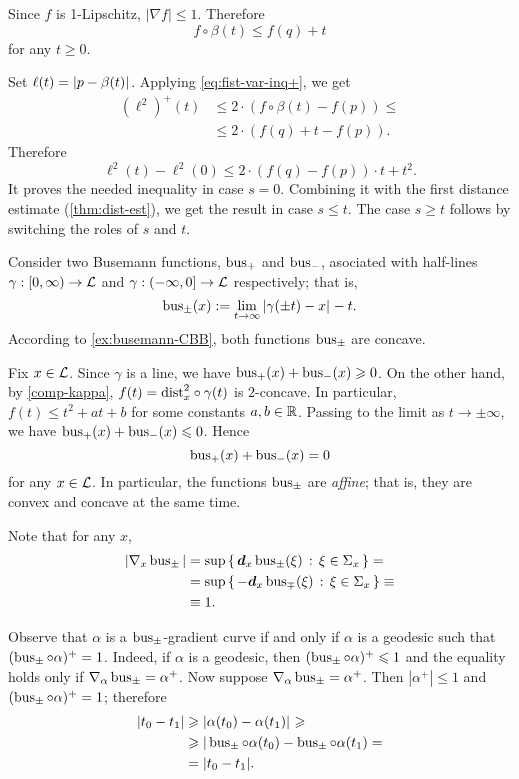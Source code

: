 Since $f$ is 1-Lipschitz, $|\nabla f|\le1$.
Therefore 
\[f\circ\beta(t)\le f(q)+t\]
for any $t\ge0$.

Set $\ell(t)=\dist{p}{\beta(t)}{}$.
Applying \ref{eq:fist-var-inq+}, we get
\begin{align*}
(\ell^2)^+(t)
&\le 2\cdot \left(f\circ\beta(t)-f(p)\right)\le 
\\
&\le2\cdot\left(f(q)+t-f(p)\right).
\end{align*}
Therefore 
\[\ell^2(t)-\ell^2(0)\le 2\cdot\left(f(q)-f(p)\right)\cdot t + t^2.\]
It proves the needed inequality in case $s=0$.
Combining it with the first distance estimate (\ref{thm:dist-est}), we get the result in case $s\le t$.
The case $s\ge t$ follows by switching the roles of $s$ and $t$.
\qeds


 Consider two Busemann functions, $\operatorname{\rm bus}\nolimits_+$ and $\operatorname{\rm bus}\nolimits_-$, asociated with half-lines $\gamma:[0,\infty)\to \mathcal{L}$ and $\gamma:(-\infty,0]\to \mathcal{L}$ respectively; that is,
\[
\bus_\pm(x)
\df
\lim_{t\to\infty}\dist{\gamma(\pm t)}{x}{}- t.
\]
According to \ref{ex:busemann-CBB}, 
both functions $\operatorname{\rm bus}\nolimits_\pm$ are concave.

Fix $x\in \mathcal{L}$.
Since $\gamma$ is a line, we have 
$\operatorname{\rm bus}\nolimits_+(x)+\operatorname{\rm bus}\nolimits_-(x)\geqslant0$.
On the other hand, by \ref{comp-kappa}, 
$f(t)=\mathrm{dist}_x^2\circ\gamma(t)$ 
is $2$-concave.
In particular, $f(t)\le t^2+at+b$ for some constants $a,b\in\mathbb{R}$. 
Passing to the limit as $t\to\pm\infty$, we have $\operatorname{\rm bus}\nolimits_+(x)+\operatorname{\rm bus}\nolimits_-(x)\leqslant0$.
Hence
\[
\operatorname{\rm bus}\nolimits_+(x)+\operatorname{\rm bus}\nolimits_-(x)= 0
\]
for any $x\in \mathcal{L}$.
In particular, the functions $\operatorname{\rm bus}\nolimits_\pm$ are \emph{affine};
that is, they are convex and concave at the same time.

Note that for any $x$,
\begin{align*}
|\nabla_x \operatorname{\rm bus}\nolimits_\pm|
&=\sup\left\{\,{\bm{d}_x\operatorname{\rm bus}\nolimits_\pm(\xi)}\,:\,{\xi\in\Sigma_x}\,\right\}=
\\
&=\sup\left\{\,{-\bm{d}_x\operatorname{\rm bus}\nolimits_\mp(\xi)}\,:\,{\xi\in\Sigma_x}\,\right\}\equiv
\\
&\equiv1.
\end{align*}

Observe that $\alpha$ is a $\operatorname{\rm bus}\nolimits_\pm$-gradient curve
if and only if $\alpha$ is a geodesic such that $(\operatorname{\rm bus}\nolimits_\pm\circ\alpha)^+=1$.
Indeed, if $\alpha$ is a geodesic, then $(\operatorname{\rm bus}\nolimits_\pm\circ\alpha)^+\leqslant 1$ and the equality holds only if $\nabla_\alpha\operatorname{\rm bus}\nolimits_\pm=\alpha^+$.
Now suppose $\nabla_\alpha\operatorname{\rm bus}\nolimits_\pm=\alpha^+$.
Then $|\alpha^+|\le 1$ and $(\operatorname{\rm bus}\nolimits_\pm\circ\alpha)^+=1$; therefore 
\begin{align*}
|t_0-t_1|&\ge \dist{\alpha(t_0)}{\alpha(t_1)}{}\ge
\\
&\ge|\bus_\pm\circ\alpha(t_0)-\bus_\pm\circ\alpha(t_1)=
\\
&=|t_0-t_1|.
\end{align*}

